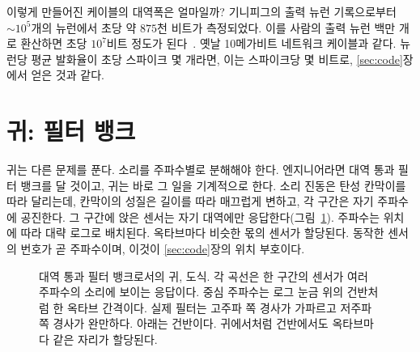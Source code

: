이렇게 만들어진 케이블의 대역폭은 얼마일까? 기니피그의 출력 뉴런 기록으로부터 $\sim10^5$개의 뉴런에서 초당 약 $875$천 비트가 측정되었다. 이를 사람의 출력 뉴런 백만 개로 환산하면 초당 $10^7$비트 정도가 된다~\cite{Koch2006}. 옛날 10메가비트 네트워크 케이블과 같다. 뉴런당 평균 발화율이 초당 스파이크 몇 개라면, 이는 스파이크당 몇 비트로, \ref{sec:code}장에서 얻은 것과 같다.

\section{귀: 필터 뱅크}

귀는 다른 문제를 푼다. 소리를 주파수별로 분해해야 한다. 엔지니어라면 대역 통과 필터 뱅크를 달 것이고, 귀는 바로 그 일을 기계적으로 한다. 소리 진동은 탄성 칸막이를 따라 달리는데, 칸막이의 성질은 길이를 따라 매끄럽게 변하고, 각 구간은 자기 주파수에 공진한다. 그 구간에 앉은 센서는 자기 대역에만 응답한다(그림~\ref{fig:filterbank}). 주파수는 위치에 따라 대략 로그로 배치된다. 옥타브마다 비슷한 몫의 센서가 할당된다. 동작한 센서의 번호가 곧 주파수이며, 이것이 \ref{sec:code}장의 위치 부호이다.

\begin{figure}[t]
\centering
{}
\caption{대역 통과 필터 뱅크로서의 귀, 도식. 각 곡선은 한 구간의 센서가 여러 주파수의 소리에 보이는 응답이다. 중심 주파수는 로그 눈금 위의 건반처럼 한 옥타브 간격이다. 실제 필터는 고주파 쪽 경사가 가파르고 저주파 쪽 경사가 완만하다. 아래는 건반이다. 귀에서처럼 건반에서도 옥타브마다 같은 자리가 할당된다.}
\label{fig:filterbank}
\end{figure}

